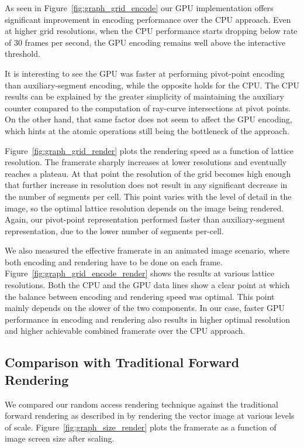 \documentclass[11pt,a4paper,twoside]{article}
\begin{document}
As seen in Figure~\ref{fig:graph_grid_encode} our GPU implementation offers significant improvement in encoding performance over the CPU approach. Even at higher grid resolutions, when the CPU performance starts dropping below rate of 30 frames per second, the GPU encoding remains well above the interactive threshold.

It is interesting to see the GPU was faster at performing pivot-point encoding than auxiliary-segment encoding, while the opposite holds for the CPU. The CPU results can be explained by the greater simplicity of maintaining the auxiliary counter compared to the computation of ray-curve intersections at pivot points. On the other hand, that same factor does not seem to affect the GPU encoding, which hints at the atomic operations still being the bottleneck of the approach.

Figure~\ref{fig:graph_grid_render} plots the rendering speed as a function of lattice resolution. The framerate sharply increases at lower resolutions and eventually reaches a plateau. At that point the resolution of the grid becomes high enough that further increase in resolution does not result in any significant decrease in the number of segments per cell. This point varies with the level of detail in the image, so the optimal lattice resolution depends on the image being rendered. Again, our pivot-point representation performed faster than auxiliary-segment representation, due to the lower number of segments per-cell.

We also measured the effective framerate in an animated image scenario, where both encoding and rendering have to be done on each frame. Figure~\ref{fig:graph_grid_encode_render} shows the results at various lattice resolutions. Both the CPU and the GPU data lines show a clear point at which the balance between encoding and rendering speed was optimal. This point mainly depends on the slower of the two components. In our case, faster GPU performance in encoding and rendering also results in higher optimal resolution and higher achievable combined framerate over the CPU approach.

\subsection {Comparison with Traditional Forward Rendering}

We compared our random access rendering technique against the traditional forward rendering as described in \cite{Kokojima06} by rendering the vector image at various levels of scale. Figure~\ref{fig:graph_size_render} plots the framerate as a function of image screen size after scaling.
\end{document}
